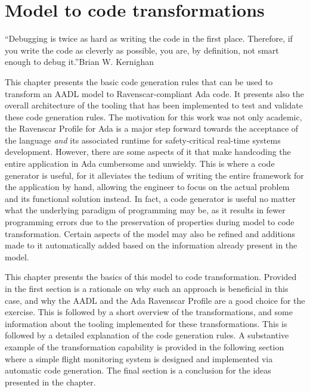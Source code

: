 \chapter{Model to code transformations}{``Debugging is twice as
  hard as writing the code in the first place. Therefore, if you write
  the code as cleverly as possible, you are, by definition, not smart
  enough to debug it.''}{Brian W. Kernighan}
\label{chap:code_gen}

This chapter presents the basic code generation rules that can be used
to transform an AADL model to Ravenscar-compliant Ada code. It
presents also the overall architecture of the tooling that has been
implemented to test and validate these code generation rules. The
motivation for this work was not only academic, the Ravenscar Profile
for Ada is a major step forward towards the acceptance of the language
\emph{and} its associated runtime for safety-critical real-time
systems development. However, there are some aspects of it that make
handcoding the entire application in Ada cumbersome and unwieldy. This
is where a code generator is useful, for it alleviates the tedium of
writing the entire framework for the application by hand, allowing the
engineer to focus on the actual problem and its functional solution
instead. In fact, a code generator is useful no matter what the
underlying paradigm of programming may be, as it results in fewer
programming errors due to the preservation of properties during model
to code transformation. Certain aspects of the model may also be
refined and additions made to it automatically added based on the
information already present in the model.

This chapter presents the basics of this model to code
transformation. Provided in the first section is a rationale on why
such an approach is beneficial in this case, and why the AADL and the
Ada Ravenscar Profile are a good choice for the exercise. This is
followed by a short overview of the transformations, and some
information about the tooling implemented for these
transformations. This is followed by a detailed explanation of the
code generation rules. A substantive example of the transformation
capability is provided in the following section where a simple flight
monitoring system is designed and implemented via automatic code
generation. The final section is a conclusion for the ideas presented
in the chapter.

